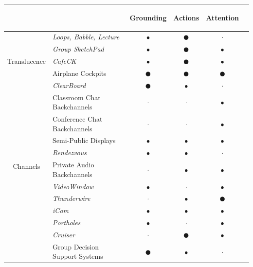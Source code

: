 \documentclass{tufte-handout}
\begin{document}
\begin{tabular}{clcccl}

& & \begin{sideways}Grounding\end{sideways} & \begin{sideways}Actions\end{sideways} & \begin{sideways}Attention\end{sideways} \\
\midrule



\multirow{5}{*}{\begin{sideways}Translucence\end{sideways}} & \emph{Loops, Babble, Lecture} &$\bullet$& $\CIRCLE$ & $\cdot$ & \citep{Erickson:2000kb} \\
 & \emph{Group SketchPad} &$\bullet$& $\CIRCLE$ &$\bullet$& \citep{Gutwin:2002tf} \\
& \emph{CafeCK} &$\bullet$& $\CIRCLE$ &$\bullet$& \citep{Ackerman:1995tj} \\
& Airplane Cockpits & $\CIRCLE$ & $\CIRCLE$ & $\CIRCLE$ & \citep{Hutchins:1995ud} \\
& \emph{ClearBoard} & $\CIRCLE$ &$\bullet$& $\cdot$ & \citep{Ishii:1992bq} \\

\midrule

\multirow{10}{*}{\begin{sideways}Channels\end{sideways}} & Classroom Chat Backchannels & $\cdot$ & $\cdot$ &$\bullet$& \citep{Yardi:2006uk} \\
& Conference Chat Backchannels & $\cdot$ & $\cdot$ &$\bullet$& \citep{McCarthy:2004im} \\
& Semi-Public Displays &$\bullet$&$\bullet$&$\bullet$& \citep{Huang:2003ef} \\
& \emph{Rendezvous} &$\bullet$&$\bullet$& $\cdot$ & \citep{Kellogg:2006vn} \\
& Private Audio Backchannels & $\cdot$ &$\bullet$&$\bullet$& \citep{Yankelovich:2005bx} \\
& \emph{VideoWindow} &$\bullet$& $\cdot$ &$\bullet$& \citep{Fish:1990fn} \\
& \emph{Thunderwire} & $\cdot$ &$\bullet$& $\CIRCLE$ & \citep{Hindus:1996cn} \\
& \emph{iCom} &$\bullet$&$\bullet$&$\bullet$& \citep{Agamanolis:2006vh} \\
& \emph{Portholes} &$\bullet$& $\cdot$ &$\bullet$& \citep{Dourish:1992fu} \\
& \emph{Cruiser} & $\cdot$ & $\CIRCLE$ &$\bullet$& \citep{Fish:1992vz} \\
& Group Decision Support Systems & $\CIRCLE$ &$\bullet$& $\cdot$ & \citep{Nunamaker:1991gk} \\


\end{tabular}
\end{document}
